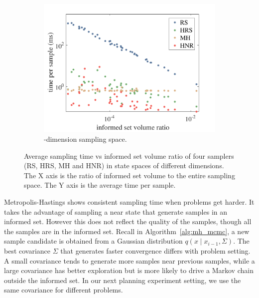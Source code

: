 \documentclass[letterpaper, 10 pt, conference]{ieeeconf}  %
\begin{document}
\begin{figure}[t!]
\begin{subfigure}[t!]{0.325\textwidth}
	\end{subfigure}
	\begin{subfigure}[t!]{0.325\textwidth}
		\centering
		\includegraphics[width=\linewidth]{fig/sampling_efficiency/sample_efficiency_6d}
		\caption{-dimension sampling space.}
		\label{fig:sampling_efficiency:6d}
	\end{subfigure}
	\caption{\captionstyle Average sampling time vs informed set volume ratio of four samplers (RS, HRS, MH and HNR) in state spaces of different dimensions. 
	The X axis is the ratio of informed set volume to the entire sampling space.
	The Y axis is the average time per sample.}
	\label{fig:sampling_efficiency}
\end{figure}

Metropolis-Hastings shows consistent sampling time when problems get harder. 
It takes the advantage of sampling a near state that generate samples in an informed set.
However this does not reflect the quality of the samples, though all the samples are in the informed set.
Recall in Algorithm~\ref{alg:mh_mcmc}, a new sample candidate is obtained from a Gaussian distribution $ q( x \mid x_{i-1}, \Sigma ) $.
The best covariance $ \Sigma $ that generates faster convergence differs with problem setting.
A small covariance tends to generate more samples near previous samples, while a large covariance has better exploration but is more likely to drive a Markov chain outside the informed set.
In our next planning experiment setting, we use the same covariance for different problems.
\end{document}
